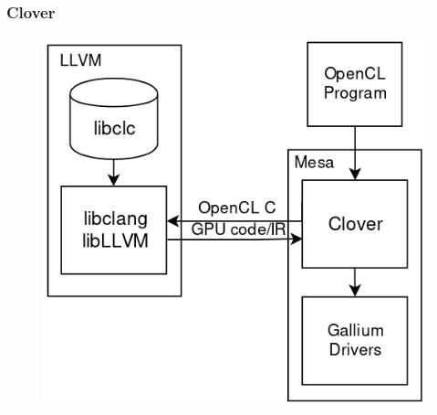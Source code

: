 \documentclass{smilebeamer}
\begin{document}
\begin{frame}
\frametitle{Clover}
\begin{figure}
\includegraphics[width=0.7\linewidth]{img/clover.png}
\end{figure}
\end{frame}

\end{document}
